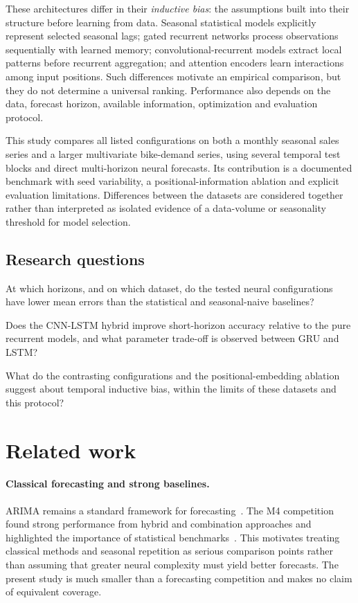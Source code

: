\documentclass[10pt,a4paper]{article}
\begin{document}
These architectures differ in their \emph{inductive bias}: the assumptions built into their structure before learning from data. Seasonal statistical models explicitly represent selected seasonal lags; gated recurrent networks process observations sequentially with learned memory; convolutional-recurrent models extract local patterns before recurrent aggregation; and attention encoders learn interactions among input positions. Such differences motivate an empirical comparison, but they do not determine a universal ranking. Performance also depends on the data, forecast horizon, available information, optimization and evaluation protocol.

This study compares all listed configurations on both a monthly seasonal sales series and a larger multivariate bike-demand series, using several temporal test blocks and direct multi-horizon neural forecasts. Its contribution is a documented benchmark with seed variability, a positional-information ablation and explicit evaluation limitations. Differences between the datasets are considered together rather than interpreted as isolated evidence of a data-volume or seasonality threshold for model selection.

\subsection{Research questions}
\begin{description}[leftmargin=1.2cm,labelwidth=1cm,itemsep=5pt]
\item[RQ1.] At which horizons, and on which dataset, do the tested neural configurations have lower mean errors than the statistical and seasonal-naive baselines?
\item[RQ2.] Does the CNN-LSTM hybrid improve short-horizon accuracy relative to the pure recurrent models, and what parameter trade-off is observed between GRU and LSTM?
\item[RQ3.] What do the contrasting configurations and the positional-embedding ablation suggest about temporal inductive bias, within the limits of these datasets and this protocol?
\end{description}

\section{Related work}
\paragraph{Classical forecasting and strong baselines.} ARIMA remains a standard framework for forecasting~\cite{box1970}. The M4 competition found strong performance from hybrid and combination approaches and highlighted the importance of statistical benchmarks~\cite{makridakis2018}. This motivates treating classical methods and seasonal repetition as serious comparison points rather than assuming that greater neural complexity must yield better forecasts. The present study is much smaller than a forecasting competition and makes no claim of equivalent coverage.
\end{document}
